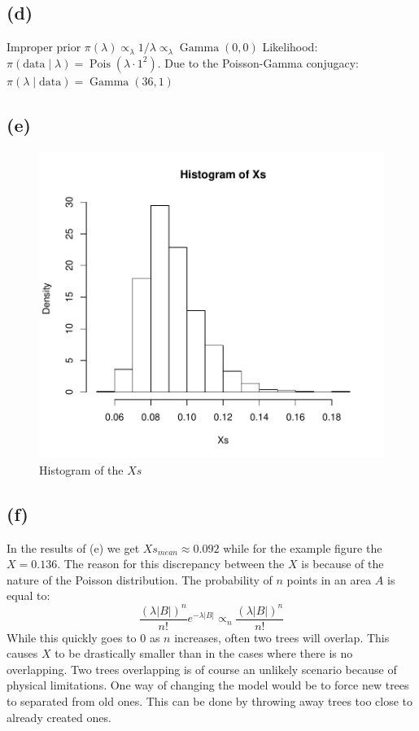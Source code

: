 \documentclass{article}
\DeclareMathOperator\Poisson{Pois}
\DeclareMathOperator\GammaDist{Gamma}
\begin{document}
\subsection{(d)}
Improper prior $\pi(\lambda) \propto_\lambda 1/\lambda \propto_\lambda \GammaDist(0, 0)$
Likelihood: $\pi(\text{data} \mid \lambda) = \Poisson(\lambda \cdot 1^2)$.
Due to the Poisson-Gamma conjugacy: $\pi(\lambda \mid \text{data}) = \GammaDist(36, 1)$

\subsection{(e)}
\begin{figure}
    \centering
    \includegraphics[scale = 0.7]{Histo_Xs.pdf}
    \caption{Histogram of the $Xs$}
\end{figure}

\subsection{(f)}
In the results of (e) we get $Xs_{mean} \approx 0.092$ while for the example figure the $X = 0.136$.
The reason for this discrepancy between the $X$ is because of the nature of the Poisson distribution.
The probability of $n$ points in an area $A$ is equal to:
$$\frac{(\lambda |B|)^n}{n!}e^{-\lambda|B|} \propto_n \frac{(\lambda |B|)^n}{n!}$$
While this quickly goes to $0$ as $n$ increases, often two trees will overlap.
This causes $X$ to be drastically smaller than in the cases where there is no overlapping.
Two trees overlapping is of course an unlikely scenario because of physical limitations.
One way of changing the model would be to force new trees to separated from old ones.
This can be done by throwing away trees too close to already created ones.
\end{document}
